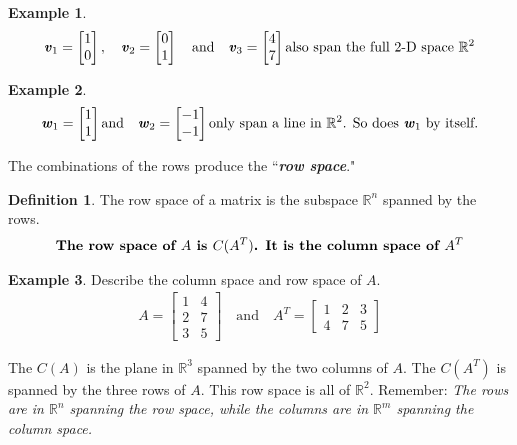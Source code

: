 \documentclass[12pt, letterpaper]{article}
\newcommand{\R}[1]{$\mathbb{R}^{#1}$}
\newcommand{\V}[1]{\textbf{\textit{#1}}}
\newcommand{\DefinitionSpace}{\vspace{15px}}
\theoremstyle{definition}
\newtheorem{definition}{Definition}[section]
\newtheorem{example}{Example}
\begin{document}
					\begin{example}
						\begin{gather*}
							\V{v}_1 = \begin{bmatrix}1 \\ 0 \end{bmatrix}, \quad \V{v}_2 = \begin{bmatrix}0 \\ 1 \end{bmatrix} \quad \text{and} \quad \V{v}_3 = \begin{bmatrix}4\\ 7 \end{bmatrix} \text{also span the full 2-D space \R{2}}
						\end{gather*}
					\end{example}
				
					\begin{example}
						\begin{gather*}
							\V{w}_1 = \begin{bmatrix}1 \\ 1 \end{bmatrix} \text{and} \quad \V{w}_2 = \begin{bmatrix}-1 \\ -1 \end{bmatrix} \text{only span a line in \R{2}. So does $\V{w}_1$ by itself.}
						\end{gather*}
					\end{example}
	
	
		
	\noindent The combinations of the rows produce the ``\textbf{\textit{row space}}."
	
	\DefinitionSpace
		\begin{definition}
			The row space of a matrix is the subspace \R{n} spanned by the rows.
				\begin{gather*}
					\text{\textbf{The row space of $A$ is $C(A^T)$. It is the column space of $A^T$}}
				\end{gather*}
		\end{definition}
	\DefinitionSpace
				\begin{example}
					Describe the column space and row space of $A$.
					\begin{gather*}
					A = \begin{bmatrix}1&4\\ 2&7 \\ 3&5 \end{bmatrix} \quad \text{and} \quad A^T = \begin{bmatrix}1&2&3 \\ 4&7&5\end{bmatrix}
					\end{gather*}
					
					The $C(A)$ is the plane in \R{3} spanned by the two columns of $A$. The $C(A^T)$ is spanned by the three rows of $A$. This row space is all of \R{2}. Remember: \textit{The rows are in \R{n} spanning the row space, while the columns are in \R{m} spanning the column space.}
				\end{example}
	\DefinitionSpace
	
\end{document}
